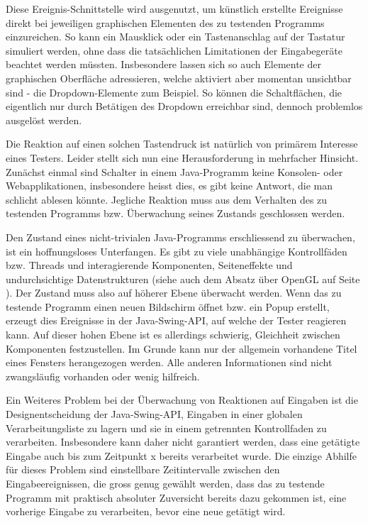 Diese Ereignis-Schnittstelle wird ausgenutzt, um künstlich erstellte
Ereignisse direkt bei jeweiligen graphischen Elementen des zu testenden 
Programms einzureichen. So kann ein Mausklick oder ein Tastenanschlag 
auf der Tastatur simuliert werden, ohne dass die tatsächlichen Limitationen
der Eingabegeräte beachtet werden müssten. Insbesondere lassen sich so
auch Elemente der graphischen Oberfläche adressieren, welche aktiviert
aber momentan unsichtbar sind - die Dropdown-Elemente zum Beispiel.
So können die Schaltflächen, die eigentlich nur durch Betätigen des
Dropdown erreichbar sind, dennoch problemlos ausgelöst werden.

Die Reaktion auf einen solchen Tastendruck ist natürlich von primärem
Interesse eines Testers. Leider stellt sich nun eine Herausforderung
in mehrfacher Hinsicht. Zunächst einmal sind Schalter in einem 
Java-Programm keine Konsolen- oder Webapplikationen, insbesondere
heisst dies, es gibt keine Antwort, die man schlicht ablesen könnte.
Jegliche Reaktion muss aus dem Verhalten des zu testenden Programms
bzw. Überwachung seines Zustands geschlossen werden.

Den Zustand eines nicht-trivialen Java-Programms erschliessend
zu überwachen, ist ein hoffnungsloses Unterfangen. Es gibt zu
viele unabhängige Kontrollfäden bzw. Threads und interagierende
Komponenten, Seiteneffekte und undurchsichtige Datenstrukturen
(siehe auch dem Absatz über OpenGL auf Seite \pageref{openglQQ}).
Der Zustand muss also auf höherer Ebene überwacht werden.
Wenn das zu testende Programm einen neuen Bildschirm öffnet
bzw. ein Popup erstellt, erzeugt dies Ereignisse in der Java-Swing-API,
auf welche der Tester reagieren kann. Auf dieser hohen Ebene ist
es allerdings schwierig, Gleichheit zwischen Komponenten
festzustellen. Im Grunde kann nur der allgemein vorhandene Titel
eines Fensters herangezogen werden. Alle anderen Informationen
sind nicht zwangsläufig vorhanden oder wenig hilfreich.

Ein Weiteres Problem bei der Überwachung von Reaktionen auf
Eingaben ist die Designentscheidung der Java-Swing-API,
Eingaben in einer globalen Verarbeitungsliste zu lagern
und sie in einem getrennten Kontrollfaden zu verarbeiten.
Insbesondere kann daher nicht garantiert werden,
dass eine getätigte Eingabe auch bis zum Zeitpunkt x
bereits verarbeitet wurde. Die einzige Abhilfe für dieses
Problem sind einstellbare Zeitintervalle zwischen
den Eingabeereignissen, die gross genug gewählt werden,
dass das zu testende Programm mit praktisch absoluter
Zuversicht bereits dazu gekommen ist, eine vorherige
Eingabe zu verarbeiten, bevor eine neue getätigt wird.

